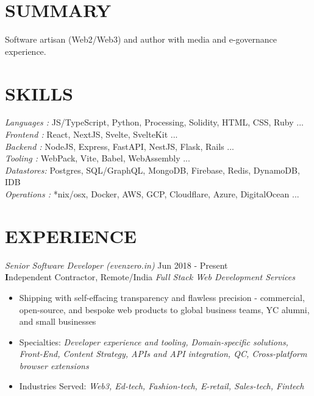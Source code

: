 \documentclass[margin, 10pt]{res} %
\begin{document}
\begin{resume}

\section{\ttfamily SUMMARY}  
Software artisan (Web2/Web3) and author with media and e-governance experience.

\section{\ttfamily SKILLS} 

{\sl Languages :} JS/TypeScript, Python, Processing, Solidity, HTML, CSS, Ruby ...\\
{\sl Frontend :} React, NextJS, Svelte, SvelteKit  ...\\
{\sl Backend :} NodeJS, Express, FastAPI, NestJS, Flask, Rails ...\\
{\sl Tooling :} WebPack, Vite, Babel, WebAssembly ... \\
{\sl Datastores:} Postgres, SQL/GraphQL, MongoDB, Firebase, Redis, DynamoDB, IDB\\
{\sl Operations :} *nix/osx, Docker, AWS, GCP, Cloudflare, Azure, DigitalOcean ...\\

\section{\ttfamily EXPERIENCE}

{\sl Senior Software Developer (evenzero.in)} \hfill Jun 2018 - \color{Green} Present\color{black}\\
\textbf Independent Contractor, Remote/India \hfill {\scriptsize \it Full Stack Web Development Services}
\begin{itemize}\smallskip\smallskip
\item Shipping with self-effacing transparency and flawless precision - commercial, open-source, and bespoke web products to global business teams, YC alumni, and small businesses
\item Specialties: {\sl Developer experience and tooling, Domain-specific solutions, Front-End, Content Strategy, APIs and API integration, QC, Cross-platform browser extensions} 
\item Industries Served: {\sl Web3, Ed-tech, Fashion-tech, E-retail, Sales-tech, Fintech } 


\end{itemize}
\end{resume}
\end{document}
